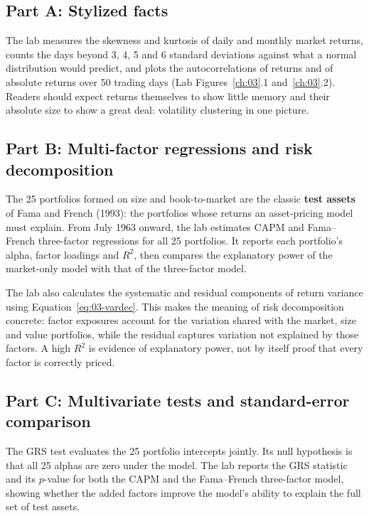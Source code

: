 \subsection*{Part A: Stylized facts}

The lab measures the skewness and kurtosis of daily and monthly market returns, counts the days beyond 3, 4, 5 and 6 standard deviations against what a normal distribution would predict, and plots the autocorrelations of returns and of absolute returns over 50 trading days (Lab Figures~\ref{ch:03}.1 and~\ref{ch:03}.2). Readers should expect returns themselves to show little memory and their absolute size to show a great deal: volatility clustering in one picture.

\subsection*{Part B: Multi-factor regressions and risk decomposition}

The 25 portfolios formed on size and book-to-market are the classic \textbf{test assets} of Fama and French (1993): the portfolios whose returns an asset-pricing model must explain. From July 1963 onward, the lab estimates CAPM and Fama--French three-factor regressions for all 25 portfolios. It reports each portfolio's alpha, factor loadings and $R^2$, then compares the explanatory power of the market-only model with that of the three-factor model.

The lab also calculates the systematic and residual components of return variance using Equation~\eqref{eq:03-vardec}. This makes the meaning of risk decomposition concrete: factor exposures account for the variation shared with the market, size and value portfolios, while the residual captures variation not explained by those factors. A high $R^2$ is evidence of explanatory power, not by itself proof that every factor is correctly priced.

\subsection*{Part C: Multivariate tests and standard-error comparison}

The GRS test evaluates the 25 portfolio intercepts jointly. Its null hypothesis is that all 25 alphas are zero under the model. The lab reports the GRS statistic and its $p$-value for both the CAPM and the Fama--French three-factor model, showing whether the added factors improve the model's ability to explain the full set of test assets.

